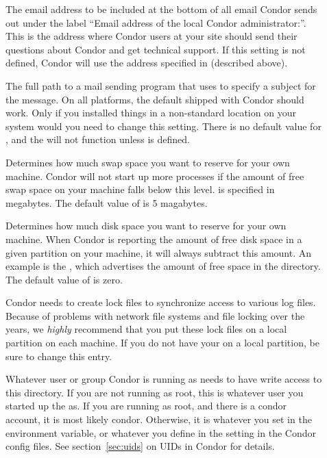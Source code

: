 \begin{description}
\item[] \label{param:CondorSupportEmail}
  The email address to be included at the bottom of all email Condor
  sends out under the label ``Email address of the local Condor
  administrator:''.  
  This is the address where Condor users at your site should send
  their questions about Condor and get technical support.
  If this setting is not defined, Condor will use the address
  specified in  (described above).

\item[] \label{param:Mail} The full path to a mail
  sending program that uses  to specify a subject for the
  message.  On all platforms, the default shipped with Condor should
  work.  Only if you installed things in a non-standard location on
  your system would you need to change this setting.  There is no
  default value for , and the  will not
  function unless  is defined.

\item[] \label{param:ReservedSwap} Determines
  how much swap space you want to reserve for your own machine.
  Condor will not start up more  processes if the
  amount of free swap space on your machine falls below this level.
   is specified in megabytes.  The default value
  of  is 5 magabytes.

\item[] \label{param:ReservedDisk} Determines
  how much disk space you want to reserve for your own machine.  When
  Condor is reporting the amount of free disk space in a given
  partition on your machine, it will always subtract this amount.  An
  example is the , which advertises the amount of free
  space in the  directory.  The default value of
   is zero.
  
\item[] \label{param:Lock} Condor needs to create
  lock files to synchronize access to various log files.  Because of
  problems with network file systems and file locking over
  the years, we \emph{highly} recommend that you put these lock
  files on a local partition on each machine.  If you do not have your
   on a local partition, be sure to change this
  entry.

  Whatever user or group Condor is running as needs to have
  write access to this directory.  If you are not running as root, this
  is whatever user you started up the  as.  If you are
  running as root, and there is a condor account, it is most
  likely condor.
  Otherwise, it is whatever you set in the 
  environment variable, or whatever you define in the
   setting in the Condor config files.
  See section~\ref{sec:uids} on UIDs in Condor for details.


\end{description}
